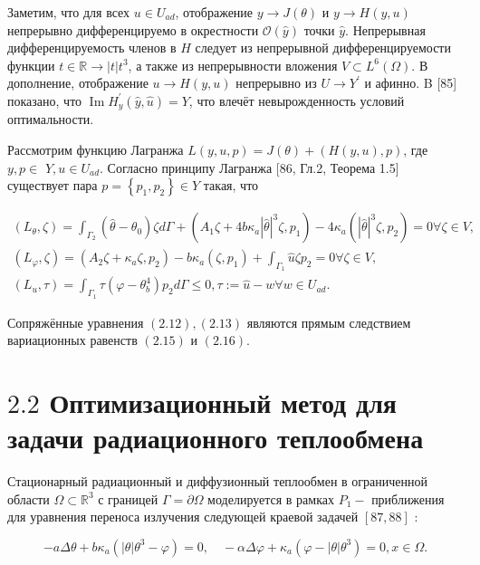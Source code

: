\documentclass[10pt]{article}
\begin{document}
Заметим, что для всех $u \in U_{a d}$, отображение $y \rightarrow J(\theta)$ и $y \rightarrow H(y, u)$ непрерывно дифференцируемо в окрестности $\mathcal{O}(\hat{y})$ точки $\hat{y}$. Непрерывная дифференцируемость членов в $H$ следует из непрерывной дифференцируемости функции $t \in \mathbb{R} \rightarrow|t| t^{3}$, а также из непрерывности вложения $V \subset L^{6}(\Omega)$. В дополнение, отображение $u \rightarrow H(y, u)$ непрерывно из $U \rightarrow Y^{\prime}$ и афинно. B [85] показано, что $\operatorname{Im} H_{y}^{\prime}(\hat{y}, \hat{u})=Y$, что влечёт невырожденность условий оптимальности.

Рассмотрим функцию Лагранжа $L(y, u, p)=J(\theta)+(H(y, u), p)$, где $y, p \in$ $Y, u \in U_{a d}$. Согласно принципу Лагранжа [86, Гл.2, Теорема 1.5] существует пара $p=\left\{p_{1}, p_{2}\right\} \in Y$ такая, что

$$
\begin{gathered}
\left(L_{\theta}, \zeta\right)=\int_{\Gamma_{2}}\left(\hat{\theta}-\theta_{0}\right) \zeta d \Gamma+\left(A_{1} \zeta+4 b \kappa_{a}|\hat{\theta}|^{3} \zeta, p_{1}\right)-4 \kappa_{a}\left(|\hat{\theta}|^{3} \zeta, p_{2}\right)=0 \forall \zeta \in V, \\
\left(L_{\varphi}, \zeta\right)=\left(A_{2} \zeta+\kappa_{a} \zeta, p_{2}\right)-b \kappa_{a}\left(\zeta, p_{1}\right)+\int_{\Gamma_{1}} \hat{u} \zeta p_{2}=0 \forall \zeta \in V, \\
\left(L_{u}, \tau\right)=\int_{\Gamma_{1}} \tau\left(\varphi-\theta_{b}^{4}\right) p_{2} d \Gamma \leqslant 0, \tau:=\hat{u}-w \forall w \in U_{a d} .
\end{gathered}
$$

Сопряжённые уравнения $(2.12),(2.13)$ являются прямым следствием вариационных равенств $(2.15)$ и $(2.16)$.

\section{$2.2$ Оптимизационный метод для задачи радиационного теплообмена}
Стационарный радиационный и диффузионный теплообмен в ограниченной области $\Omega \subset \mathbb{R}^{3}$ с границей $\Gamma=\partial \Omega$ моделируется в рамках $P_{1}-$ приближения для уравнения переноса излучения следующей краевой задачей $[87,88]$ :

$$
-a \Delta \theta+b \kappa_{a}\left(|\theta| \theta^{3}-\varphi\right)=0, \quad-\alpha \Delta \varphi+\kappa_{a}\left(\varphi-|\theta| \theta^{3}\right)=0, x \in \Omega .
$$
\end{document}
